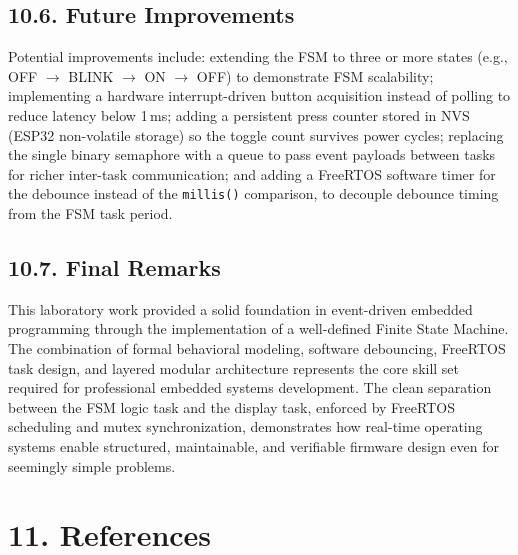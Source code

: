 \documentclass[12pt]{article}
\begin{document}
\subsection*{10.6. Future Improvements}

Potential improvements include: extending the FSM to three or more states (e.g., OFF $\rightarrow$ BLINK $\rightarrow$ ON $\rightarrow$ OFF) to demonstrate FSM scalability; implementing a hardware interrupt-driven button acquisition instead of polling to reduce latency below 1\,ms; adding a persistent press counter stored in NVS (ESP32 non-volatile storage) so the toggle count survives power cycles; replacing the single binary semaphore with a queue to pass event payloads between tasks for richer inter-task communication; and adding a FreeRTOS software timer for the debounce instead of the \texttt{millis()} comparison, to decouple debounce timing from the FSM task period.

\subsection*{10.7. Final Remarks}

This laboratory work provided a solid foundation in event-driven embedded programming through the implementation of a well-defined Finite State Machine. The combination of formal behavioral modeling, software debouncing, FreeRTOS task design, and layered modular architecture represents the core skill set required for professional embedded systems development. The clean separation between the FSM logic task and the display task, enforced by FreeRTOS scheduling and mutex synchronization, demonstrates how real-time operating systems enable structured, maintainable, and verifiable firmware design even for seemingly simple problems.

\section*{11. References}
\end{document}
